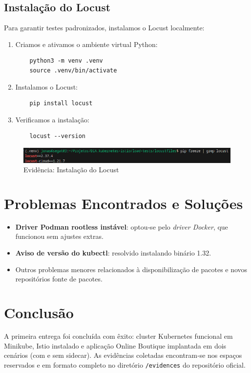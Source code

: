 \documentclass[9pt,a4paper,twocolumn,twoside]{tau-class/tau}
\begin{document}
\subsection{Instalação do Locust}
Para garantir testes padronizados, instalamos o Locust localmente:
\begin{enumerate}
  \item Criamos e ativamos o ambiente virtual Python:
    \begin{verbatim}
    python3 -m venv .venv
    source .venv/bin/activate
    \end{verbatim}
  \item Instalamos o Locust:
    \begin{verbatim}
    pip install locust
    \end{verbatim}
  \item Verificamos a instalação:
    \begin{verbatim}
    locust --version
    \end{verbatim}
\end{enumerate}

\begin{figure}
    \centering
    \includegraphics[width=1\linewidth]{figures/evidence-locust.png}
    \caption{Evidência: Instalação do Locust}
    \label{fig:locust}
\end{figure}
\section{Problemas Encontrados e Soluções}
\begin{itemize}[leftmargin=*]
  \item \textbf{Driver Podman rootless instável}: optou‑se pelo \emph{driver Docker}, que funcionou sem ajustes extras.
  \item \textbf{Aviso de versão do kubectl}: resolvido instalando binário 1.32.
  \item Outros problemas menores relacionados à disponibilização de pacotes e novos repositórios fonte de pacotes.
\end{itemize}

\section{Conclusão}

A primeira entrega foi concluída com êxito: cluster Kubernetes funcional em
Minikube, Istio instalado e aplicação Online Boutique implantada em dois
cenários (com e sem sidecar). As evidências coletadas encontram‑se nos espaços
reservados e em formato completo no diretório \texttt{/evidences} do
repositório oficial.


\printbibliography

\end{document}
